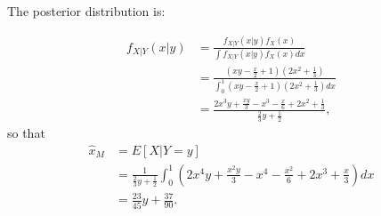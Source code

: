 \begin{problem}{4} The posterior distribution is:

\begin{align*}
f_{X|Y}(x|y) &= \frac{f_{X|Y}(x|y) f_{X}(x)}{\int f_{X|Y}(x|y) f_{X}(x) dx} \\
& = \frac{(xy- \frac{x}{2}+1)(2x^2+\frac{1}{3})}{\int_0^1 (xy- \frac{x}{2}+1)(2x^2+\frac{1}{3}) dx}\\
& = \frac{2x^3y+\frac{xy}{3}-x^3-\frac{x}{6}+2x^2+\frac{1}{3}}{\frac{2}{3}y+\frac{1}{2}},
\end{align*} 
so that
\begin{align*}
\hat x_M &= E[X|Y=y]\\
& = \frac{1}{\frac{2}{3}y+\frac{1}{2}} \int_0^1 \left (2x^4y+\frac{x^2y}{3}-x^4-\frac{x^2}{6}+2x^3+\frac{x}{3} \right)dx \\
& = \frac{23}{45}y+\frac{37}{90}.
\end{align*} 

\end{problem}










